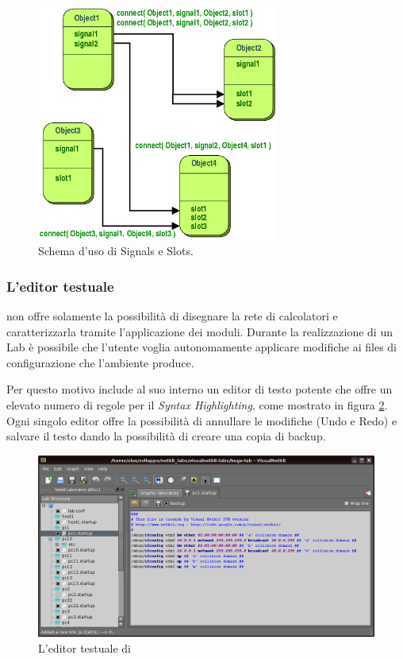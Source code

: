 \begin{figure}[!htb]
	\centering
	\includegraphics[width=8cm]{images/signals_slots.png}
	\caption{Schema d'uso di Signals e Slots.}
	\label{figura:qt_signals_slots}
\end{figure}

\subsubsection*{L'editor testuale}
\visualnetkit{} non offre solamente la possibilità di disegnare la rete di calcolatori e caratterizzarla tramite l'applicazione dei moduli. Durante la realizzazione di un Lab è possibile che l'utente voglia autonomamente applicare modifiche ai files di configurazione che l'ambiente produce.

Per questo motivo \visualnetkit{} include al suo interno un editor di testo potente che offre un elevato numero di regole per il \emph{Syntax Highlighting}, come mostrato in figura \ref{figura:vn_text}. Ogni singolo editor offre la possibilità di annullare le modifiche (Undo e Redo) e salvare il testo dando la possibilità di creare una copia di backup.

\begin{figure}[!htb]
	\centering
	\includegraphics[width=12cm]{images/visualnetkit_editor.png}
	\caption{L'editor testuale di \visualnetkit{}}
	\label{figura:vn_text}
\end{figure}

